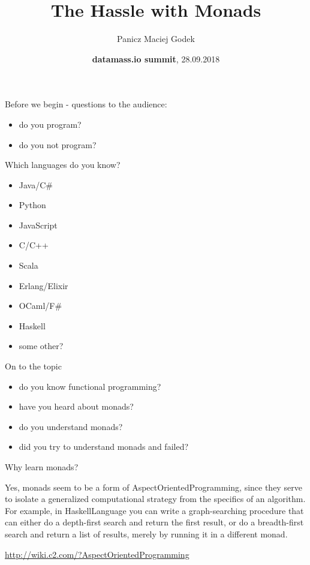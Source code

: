 \documentclass{beamer}
\title{\textbf{The Hassle with Monads}}
\author{Panicz Maciej Godek}
\institute{
  \tiny{\href{https://twitter.com/PaniczGodek}{\textbf{@PaniczGodek}}} \\
  \normalsize{\url{https://github.com/panicz/writings/tree/master/talks/datamass}}
}
\date{\textbf{datamass.io summit}, 28.09.2018}
\begin{document}
\begin{frame}
  \titlepage
\end{frame}

\begin{frame}{Before we begin - questions to the audience:}
  \begin{itemize} \pause
  \item do you program? \pause
  \item do you not program?
  \end{itemize}
\end{frame}

\begin{frame}{Which languages do you know?}
  \begin{itemize} \pause
  \item Java/C\# \pause
  \item Python \pause
  \item JavaScript \pause
  \item C/C++ \pause
  \item Scala \pause
  \item Erlang/Elixir \pause
  \item OCaml/F\# \pause
  \item Haskell \pause
  \item some other?
  \end{itemize}
\end{frame}

\begin{frame}{On to the topic}
  \begin{itemize} \pause
  \item do you know functional programming? \pause
  \item have you heard about monads? \pause
  \item do you understand monads? \pause
  \item did you try to understand monads and failed?
  \end{itemize}
\end{frame}


\begin{frame}{Why learn monads?}

  \begin{displayquote}
    Yes, monads seem to be a form of AspectOrientedProgramming,
    since they serve to isolate a generalized computational
    strategy from the specifics of an algorithm. For example,
    in HaskellLanguage you can write a graph-searching
    procedure that can either do a depth-first search
    and return the first result, or do a breadth-first
    search and return a list of results, merely by running
    it in a different monad.
  \end{displayquote}

  \begin{flushright}
    {\footnotesize \url{http://wiki.c2.com/?AspectOrientedProgramming}}
  \end{flushright}
  
\end{frame}
\end{document}

